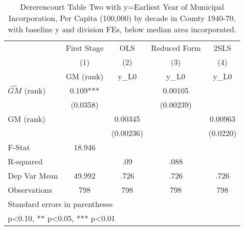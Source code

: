 \begin{table}[htbp]\centering
\def\sym#1{\ifmmode^{#1}\else\(^{#1}\)\fi}
\caption{Dererencourt Table Two with y=Earliest Year of Municipal Incorporation, Per Capita (100,000) by decade in County 1940-70, with baseline y and division FEs, below median area incorporated.}
\begin{tabular}{l*{4}{c}}
\toprule
                    & First Stage   &         OLS   &Reduced Form   &        2SLS   \\
                    &\multicolumn{1}{c}{(1)}&\multicolumn{1}{c}{(2)}&\multicolumn{1}{c}{(3)}&\multicolumn{1}{c}{(4)}\\
                    &\multicolumn{1}{c}{GM  (rank)}&\multicolumn{1}{c}{y\_L0}&\multicolumn{1}{c}{y\_L0}&\multicolumn{1}{c}{y\_L0}\\
\midrule
$\hat{GM}$ (rank)   &       0.109***&               &     0.00105   &               \\
                    &    (0.0358)   &               &   (0.00239)   &               \\
\addlinespace
GM  (rank)          &               &     0.00345   &               &     0.00963   \\
                    &               &   (0.00236)   &               &    (0.0220)   \\
\midrule
F-Stat              &      18.946   &               &               &               \\
R-squared           &               &         .09   &        .088   &               \\
Dep Var Mean        &      49.992   &        .726   &        .726   &        .726   \\
Observations        &         798   &         798   &         798   &         798   \\
\bottomrule
\multicolumn{5}{l}{\footnotesize Standard errors in parentheses}\\
\multicolumn{5}{l}{\footnotesize * p<0.10, ** p<0.05, *** p<0.01}\\
\end{tabular}
\end{table}
